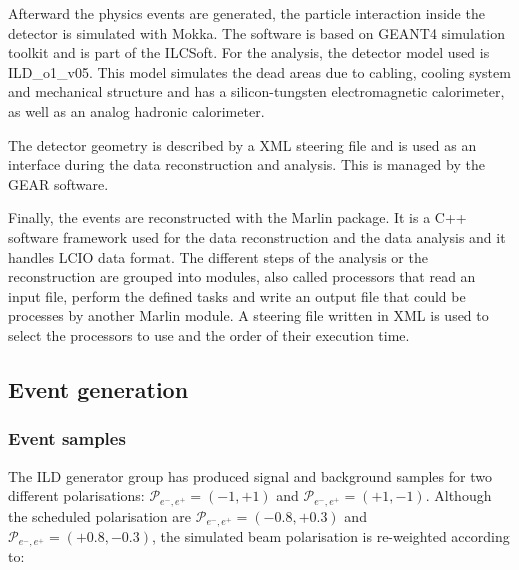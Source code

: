 
    Afterward the physics events are generated, the particle interaction inside the detector is simulated with Mokka\cite{Mokka}.
    The software is based on GEANT4 simulation toolkit\cite{GEANT4} and is part of the ILCSoft.
    For the analysis, the detector model used is ILD\_o1\_v05.
    This model simulates the dead areas due to cabling, cooling system and mechanical structure and has a silicon-tungsten electromagnetic calorimeter, as well as an analog hadronic calorimeter.
    
    The detector geometry is described by a XML steering file and is used as an interface during the data reconstruction and analysis.
    This is managed by the \gls{GEAR} software\cite{GEAR}.

    Finally, the events are reconstructed with the \gls{Marlin} package\cite{MARLIN}.
    It is a C++ software framework used for the data reconstruction and the data analysis and it handles \gls{LCIO} data format.
    The different steps of the analysis or the reconstruction are grouped into modules, also called processors that read an input file, perform the defined tasks and write an output file that could be processes by another \gls{Marlin} module.
    A steering file written in XML is used to select the processors to use and the order of their execution time.

  \subsection{Event generation}
     
     \subsubsection{Event samples}

     The \gls{ILD} generator group has produced signal and background samples for two different polarisations:  $\mathcal{P}_{e^-,e^+} = (-1,+1)$ and $\mathcal{P}_{e^-,e^+} = (+1,-1)$.
     Although the scheduled polarisation are $\mathcal{P}_{e^-,e^+} = (-0.8,+0.3)$ and  $\mathcal{P}_{e^-,e^+} = (+0.8,-0.3)$, the simulated beam polarisation is re-weighted according to:
     
